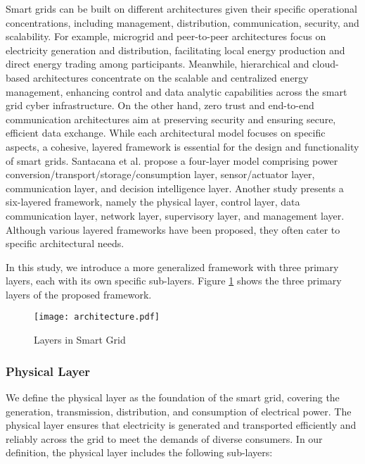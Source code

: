 \documentclass[10pt, journal]{IEEEtran}
\begin{document}
Smart grids can be built on different architectures given their specific operational concentrations, including management, distribution, communication, security, and scalability. For example, microgrid and peer-to-peer architectures focus on electricity generation and distribution, facilitating local energy production and direct energy trading among participants. Meanwhile, hierarchical and cloud-based architectures concentrate on the scalable and centralized energy management, enhancing control and data analytic capabilities across the smart grid cyber infrastructure. On the other hand, zero trust and end-to-end communication architectures aim at preserving security and ensuring secure, efficient data exchange. While each architectural model focuses on specific aspects, a cohesive, layered framework is essential for the design and functionality of smart grids. Santacana et al. \cite{santacana2010getting} propose a four-layer model comprising power conversion/transport/storage/consumption layer, sensor/actuator layer, communication layer, and decision intelligence layer. Another study \cite{stoustrup2019smart} presents a six-layered framework, namely the physical layer, control layer, data communication layer, network layer, supervisory layer, and management layer. Although various layered frameworks have been proposed, they often cater to specific architectural needs. 

In this study, we introduce a more generalized framework with three primary layers, each with its own specific sub-layers. Figure \ref{figure:layers} shows the three primary layers of the proposed framework.

\begin{figure}[htbp]
\centerline{\texttt{[image: architecture.pdf]}}
\caption{Layers in Smart Grid}
\label{figure:layers}
\end{figure}		

\subsubsection{Physical Layer}

We define the physical layer as the foundation of the smart grid, covering the generation, transmission, distribution, and consumption of electrical power. The physical layer ensures that electricity is generated and transported efficiently and reliably across the grid to meet the demands of diverse consumers. In our definition, the physical layer includes the following sub-layers:
\end{document}
